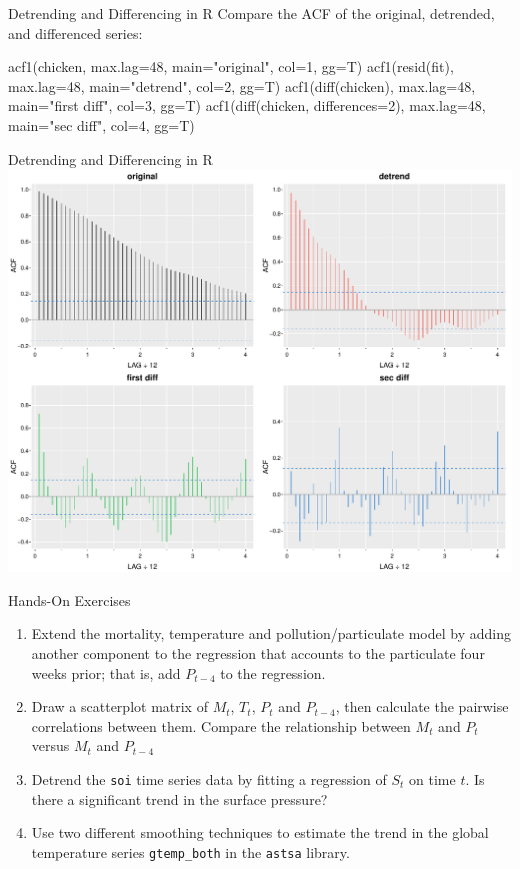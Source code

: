 \documentclass[ignorenonframetext,xcolor=x11names]{beamer}
\begin{document}
\begin{frame}[fragile]{Detrending and Differencing in R}
Compare the ACF of the original, detrended, and differenced series:
\begin{Rcode}
acf1(chicken, max.lag=48, 
     main="original", col=1, gg=T)
acf1(resid(fit), max.lag=48, 
     main="detrend", col=2, gg=T)
acf1(diff(chicken), max.lag=48, 
     main="first diff", col=3, gg=T)
acf1(diff(chicken, differences=2), max.lag=48, 
     main="sec diff", col=4, gg=T)
\end{Rcode}
\end{frame}

\begin{frame}{Detrending and Differencing in R}
\centering
\includegraphics[width=.9\textwidth]{figure41.pdf}
\end{frame}



\begin{frame}{Hands-On Exercises}
\begin{enumerate}
  \item Extend the mortality, temperature and pollution/particulate model by adding another component to the regression that accounts to the particulate four weeks prior; that is, add $P_{t-4}$ to the regression.
  \item Draw a scatterplot matrix of $M_t$, $T_t$, $P_t$ and $P_{t-4}$, then calculate the pairwise correlations between them. Compare the relationship between $M_t$ and $P_t$ versus $M_t$ and $P_{t-4}$
  \item Detrend the \texttt{soi} time series data by fitting a regression of $S_t$ on time $t$. Is there a significant trend in the surface pressure?
  \item Use two different smoothing techniques to estimate the trend in the global temperature series \texttt{gtemp\_both} in the \texttt{astsa} library.
\end{enumerate}
\end{frame}
\end{document}
